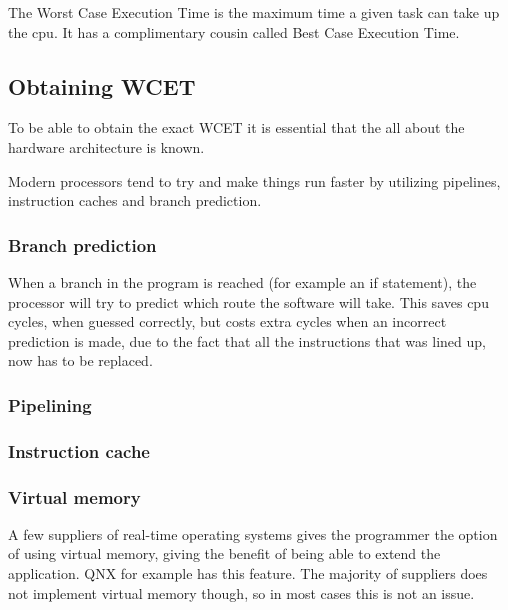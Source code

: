 The Worst Case Execution Time is the maximum time a given task can take up the cpu. It has a complimentary cousin called Best Case Execution Time.


\subsection{Obtaining WCET}
To be able to obtain the exact WCET it is essential that the all about the hardware architecture is known.

Modern processors tend to try and make things run faster by utilizing pipelines, instruction caches and branch prediction.

\subsubsection{Branch prediction}
When a branch in the program is reached (for example an if statement), the processor will try to predict which route the software will take. This saves cpu cycles, when guessed correctly, but costs extra cycles when an incorrect prediction is made, due to the fact that all the instructions that was lined up, now has to be replaced.

\subsubsection{Pipelining}

\subsubsection{Instruction cache}

\subsubsection{Virtual memory}
A few suppliers of real-time operating systems gives the programmer the option of using virtual memory, giving the benefit of being able to extend the application. QNX for example has this feature.
The majority of suppliers does not implement virtual memory though, so in most cases this is not an issue.